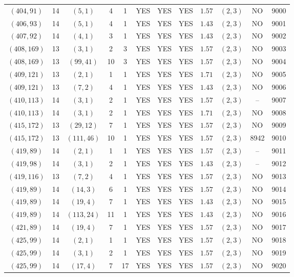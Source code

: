 \begin{longtable}{|c|c|c|c|c|c|c|c|c|c|c|c|}
$(404,91)$ & 14 & $(5,1)$ & 4 & 1 & YES & YES & YES & $1.57$ & $(2,3)$ & NO & 9000\\
$(406,93)$ & 14 & $(5,1)$ & 4 & 1 & YES & YES & YES & $1.43$ & $(2,3)$ & NO & 9001\\
$(407,92)$ & 14 & $(4,1)$ & 3 & 1 & YES & YES & YES & $1.43$ & $(2,3)$ & NO & 9002\\
$(408,169)$ & 13 & $(3,1)$ & 2 & 3 & YES & YES & YES & $1.57$ & $(2,3)$ & NO & 9003\\
$(408,169)$ & 13 & $(99,41)$ & 10 & 3 & YES & YES & YES & $1.57$ & $(2,3)$ & NO & 9004\\
$(409,121)$ & 13 & $(2,1)$ & 1 & 1 & YES & YES & YES & $1.71$ & $(2,3)$ & NO & 9005\\
$(409,121)$ & 13 & $(7,2)$ & 4 & 1 & YES & YES & YES & $1.43$ & $(2,3)$ & NO & 9006\\
$(410,113)$ & 14 & $(3,1)$ & 2 & 1 & YES & YES & YES & $1.57$ & $(2,3)$ & -- & 9007\\
$(410,113)$ & 14 & $(3,1)$ & 2 & 1 & YES & YES & YES & $1.71$ & $(2,3)$ & NO & 9008\\
$(415,172)$ & 13 & $(29,12)$ & 7 & 1 & YES & YES & YES & $1.57$ & $(2,3)$ & NO & 9009\\
$(415,172)$ & 13 & $(111,46)$ & 10 & 1 & YES & YES & YES & $1.57$ & $(2,3)$ & 8942 & 9010\\
$(419,89)$ & 14 & $(2,1)$ & 1 & 1 & YES & YES & YES & $1.57$ & $(2,3)$ & -- & 9011\\
$(419,98)$ & 14 & $(3,1)$ & 2 & 1 & YES & YES & YES & $1.43$ & $(2,3)$ & -- & 9012\\
$(419,116)$ & 13 & $(7,2)$ & 4 & 1 & YES & YES & YES & $1.57$ & $(2,3)$ & NO & 9013\\
$(419,89)$ & 14 & $(14,3)$ & 6 & 1 & YES & YES & YES & $1.57$ & $(2,3)$ & NO & 9014\\
$(419,89)$ & 14 & $(19,4)$ & 7 & 1 & YES & YES & YES & $1.43$ & $(2,3)$ & NO & 9015\\
$(419,89)$ & 14 & $(113,24)$ & 11 & 1 & YES & YES & YES & $1.43$ & $(2,3)$ & NO & 9016\\
$(421,89)$ & 14 & $(19,4)$ & 7 & 1 & YES & YES & YES & $1.57$ & $(2,3)$ & NO & 9017\\
$(425,99)$ & 14 & $(2,1)$ & 1 & 1 & YES & YES & YES & $1.57$ & $(2,3)$ & NO & 9018\\
$(425,99)$ & 14 & $(3,1)$ & 2 & 1 & YES & YES & YES & $1.57$ & $(2,3)$ & NO & 9019\\
$(425,99)$ & 14 & $(17,4)$ & 7 & 17 & YES & YES & YES & $1.57$ & $(2,3)$ & NO & 9020\\

\end{longtable}
